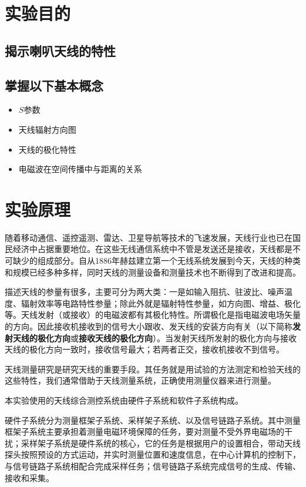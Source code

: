 \documentclass[12pt,a4paper,UTF8]{article}
\begin{document}

\maketoc    %

\section{实验目的}

\subsection{揭示喇叭天线的特性}

\subsection{掌握以下基本概念}
\begin{itemize}
    \item $S$参数
    \item 天线辐射方向图
    \item 天线的极化特性
    \item 电磁波在空间传播中与距离的关系
\end{itemize}
\section{实验原理}

随着移动通信、遥控遥测、雷达、卫星导航等技术的飞速发展，天线行业也已在国民经济中占据重要地位。在这些无线通信系统中不管是发送还是接收，天线都是不可缺少的组成部分。自从1886年赫兹建立第一个无线系统发展到今天，天线的种类和规模已经多种多样，同时天线的测量设备和测量技术也不断得到了改进和提高。

描述天线的参量有很多，主要可分为两大类：一是如输入阻抗、驻波比、噪声温度、辐射效率等电路特性参量；除此外就是辐射特性参量，如方向图、增益、极化等。天线发射（或接收）的电磁波都有其极化特性。所谓极化是指电磁波电场矢量的方向。因此接收机接收到的信号大小跟收、发天线的安装方向有关（以下简称\textbf{发射天线的极化方向}或\textbf{接收天线的极化方向}）。当发射天线所发射的极化方向与接收天线的极化方向一致时，接收信号最大；若两者正交，接收机接收不到信号。

天线测量研究是研究天线的重要手段。其任务就是用试验的方法测定和检验天线的这些特性，我们通常借助于天线测量系统，正确使用测量仪器来进行测量。

本实验使用的天线综合测控系统由硬件子系统和软件子系统构成。 

硬件子系统分为测量框架子系统、采样架子系统、以及信号链路子系统。其中测量框架子系统主要承担着测量电磁环境保障的任务，要对测量不受外界电磁场的干扰；采样架子系统是硬件系统的核心，它的任务是根据用户的设置相合，带动天线探头按照预设的方式运动，并实时测量位置和速度信息，在中心计算机的控制下，与信号链路子系统相配合完成采样任务；信号链路子系统完成信号的生成、传输、接收和采集。
\end{document}
